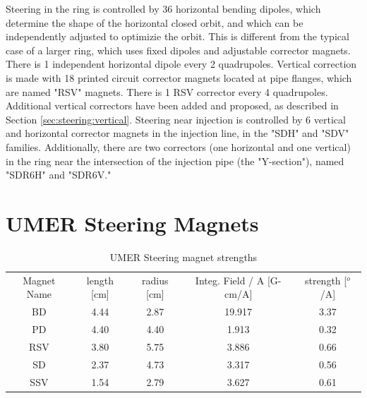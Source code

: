 Steering in the ring is controlled by 36 horizontal bending dipoles, which determine the shape of the horizontal closed orbit, and which can be independently adjusted to optimizie the orbit. This is different from the typical case of a larger ring, which uses fixed dipoles and adjustable corrector magnets. There is 1 independent horizontal dipole every 2 quadrupoles.  Vertical correction is made with 18 printed circuit corrector magnets located at pipe flanges, which are named "RSV" magnets. There is 1 RSV corrector every 4 quadrupoles. Additional vertical correctors have been added and proposed, as described in Section \ref{sec:steering:vertical}. Steering near injection is controlled by 6 vertical and horizontal corrector magnets in the injection line, in the "SDH" and "SDV" families. Additionally, there are two correctors (one horizontal and one vertical) in the ring near the intersection of the injection pipe (the "Y-section"), named "SDR6H" and "SDR6V." 







\section{UMER Steering Magnets}

\begin{table}[h]
\centering
\caption{UMER Steering magnet strengths}
\label{tab:UMERsteererstrength}
\begin{tabular}{|c|c|c|c|c|}
\hline
Magnet Name & length [cm] & radius [cm] & Integ. Field / A [G-cm/A] & strength [$^o$/A] \\
BD & 4.44 & 2.87 & 19.917& 3.37 \\
PD & 4.40 & 4.40 & 1.913 & 0.32 \\
RSV& 3.80 & 5.75 & 3.886 & 0.66 \\
SD & 2.37 & 4.73 & 3.317 & 0.56 \\
SSV& 1.54 & 2.79 & 3.627 & 0.61 \\
\hline
\hline
\end{tabular}
\end{table}



